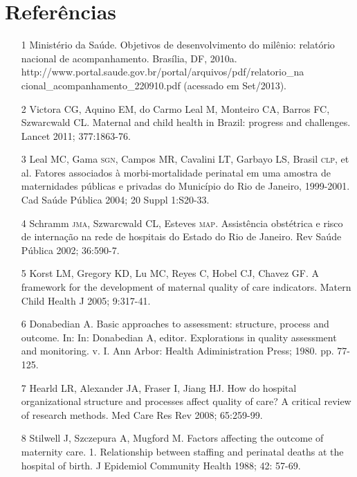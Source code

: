 \documentclass{article}
\begin{document}
\section*{Referências}
\begin{itemize}

\item[1] Ministério da Saúde. Objetivos de desenvolvimento do milênio:
relatório nacional de acompanhamento. Brasília, DF, 2010a.
http://www.portal.saude.gov.br/portal/arquivos/pdf/relatorio\_{}na
cional\_{}acompanhamento\_{}220910.pdf (acessado em Set/2013).

\item[2] Victora CG, Aquino EM, do Carmo Leal M, Monteiro CA, Barros FC,
Szwarcwald CL. Maternal and child health in Brazil: progress and challenges.
Lancet 2011; 377:1863-76.

\item[3] Leal MC, Gama \textsc{sgn}, Campos MR, Cavalini LT, Garbayo LS, Brasil \textsc{clp},
et al. Fatores associados à morbi-mortalidade perinatal em uma amostra de
maternidades públicas e privadas do Município do Rio de Janeiro, 1999-2001. Cad
Saúde Pública 2004; 20 Suppl 1:S20-33.

\item[4] Schramm \textsc{jma}, Szwarcwald CL, Esteves \textsc{map}. Assistência obstétrica e
risco de internação na rede de hospitais do Estado do Rio de Janeiro. Rev Saúde
Pública 2002; 36:590-7.

\item[5] Korst LM, Gregory KD, Lu MC, Reyes C, Hobel CJ, Chavez GF. A
framework for the development of maternal quality of care indicators. Matern
Child Health J 2005; 9:317-41.

\item[6] Donabedian A. Basic approaches to assessment: structure, process
and outcome. In: In: Donabedian A, editor. Explorations in quality assessment
and monitoring. v. I. Ann Arbor: Health Adiministration Press; 1980. pp.
77-125.

\item[7] Hearld LR, Alexander JA, Fraser I, Jiang HJ. How do hospital
organizational structure and processes affect quality of care? A critical review
of research methods. Med Care Res Rev 2008; 65:259-99.

\item[8] Stilwell J, Szczepura A, Mugford M. Factors affecting the outcome
of maternity care. 1. Relationship between staffing and perinatal deaths at the
hospital of birth. J Epidemiol Community Health 1988; 42:
57-69.


\end{itemize}
\end{document}
